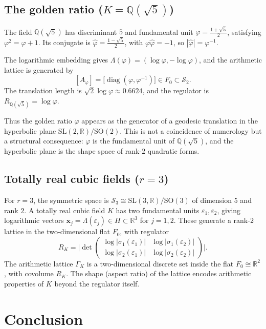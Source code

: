 \documentclass[12pt]{article}
\theoremstyle{definition}
\theoremstyle{remark}
\newcommand{\R}{\mathbb{R}}
\newcommand{\Q}{\mathbb{Q}}
\newcommand{\SL}{\mathrm{SL}}
\newcommand{\SO}{\mathrm{SO}}
\newcommand{\calM}{\mathcal{S}}
\newcommand{\diag}{\operatorname{diag}}
\begin{document}
\subsection{The golden ratio ($K = \Q(\sqrt{5})$)}

The field $\Q(\sqrt{5})$ has discriminant $5$ and fundamental unit
$\varphi = \frac{1+\sqrt{5}}{2}$, satisfying $\varphi^2 = \varphi + 1$.
Its conjugate is $\hat\varphi = \frac{1-\sqrt{5}}{2}$, with
$\varphi\hat\varphi = -1$, so $|\hat\varphi| = \varphi^{-1}$.

The logarithmic embedding gives
$\Lambda(\varphi) = (\log\varphi, -\log\varphi)$,
and the arithmetic lattice is generated by
\[
  [A_\varphi] = \bigl[\diag(\varphi, \varphi^{-1})\bigr]
  \in F_0 \subset \calM_2.
\]
The translation length is $\sqrt{2}\log\varphi \approx 0.6624$,
and the regulator is $R_{\Q(\sqrt{5})} = \log\varphi$.

Thus the golden ratio $\varphi$ appears as the generator of a geodesic
translation in the hyperbolic plane $\SL(2,\R)/\SO(2)$.
This is not a coincidence of numerology but a structural consequence:
$\varphi$ is the fundamental unit of $\Q(\sqrt{5})$, and the
hyperbolic plane is the shape space of rank-$2$ quadratic forms.

\subsection{Totally real cubic fields ($r = 3$)}

For $r = 3$, the symmetric space is $\calM_3 \cong \SL(3,\R)/\SO(3)$
of dimension $5$ and rank $2$.
A totally real cubic field $K$ has two fundamental units
$\varepsilon_1, \varepsilon_2$, giving logarithmic vectors
$\mathbf{x}_j = \Lambda(\varepsilon_j) \in H \subset \R^3$ for $j=1,2$.
These generate a rank-$2$ lattice in the two-dimensional flat $F_0$,
with regulator
\[
  R_K = \bigl|\det\begin{pmatrix}
    \log|\sigma_1(\varepsilon_1)| & \log|\sigma_1(\varepsilon_2)| \\
    \log|\sigma_2(\varepsilon_1)| & \log|\sigma_2(\varepsilon_2)|
  \end{pmatrix}\bigr|.
\]
The arithmetic lattice $\Gamma_K$ is a two-dimensional discrete set
inside the flat $F_0 \cong \R^2$, with covolume $R_K$.
The shape (aspect ratio) of the lattice encodes arithmetic properties
of $K$ beyond the regulator itself.

\section{Conclusion}
\label{sec:conclusion}
\end{document}
